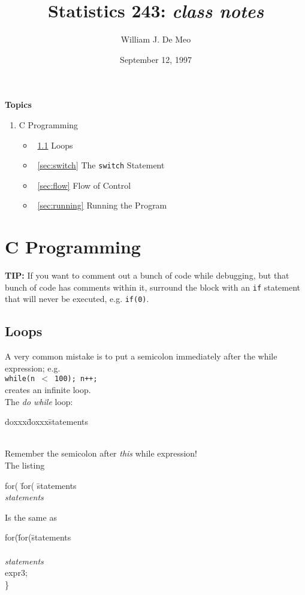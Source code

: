 \documentclass{article}
\begin{document}
\title{Statistics 243: \emph{class notes}}
\author{William J. De Meo}
\date{September 12, 1997}
\maketitle

{\bf Topics}
\begin{enumerate}
\item C Programming
\begin{itemize}
\item ~\ref{sec:loops} Loops
\item ~\ref{sec:switch} The {\tt switch} Statement
\item ~\ref{sec:flow} Flow of Control
\item ~\ref{sec:running} Running the Program
\end{itemize}
\end{enumerate}



\section{C Programming}
{\bf TIP:}  If you want to comment out a bunch of code while debugging, but that
bunch of code has comments within it, surround the block with an {\tt if}
statement that will never be executed, e.g. {\tt if(0)}.

\subsection{Loops}
\label{sec:loops}

A very common mistake is to put a semicolon immediately after the 
while expression; e.g. \\
{\tt while(n $<$ 100); n++;} \\
creates an infinite loop.
\\

The {\it do while} loop:
\begin{tabbing}
doxxx\=doxxx\= statements\kill
{}\> \\
\> \\
 \>
\end{tabbing}
Remember the semicolon after \emph{this} while expression!
\\
The listing
\begin{tabbing}
for( \= for( \= statements \kill
{}\>\\
\>\>\emph{statements}
\end{tabbing}
Is the same as
\begin{tabbing}
for(\=for(\=statements\kill
{}\>\\
\>\\
\>\>\emph{statements}\\
\>\>expr3;\\
\>\}\>
\end{tabbing}
\end{document}
